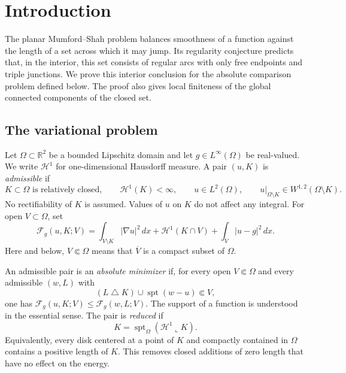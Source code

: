 \section{Introduction}
The planar Mumford--Shah problem balances smoothness of a function against
the length of a set across which it may jump.  Its regularity conjecture
predicts that, in the interior, this set consists of regular arcs with only
free endpoints and triple junctions.  We prove this interior conclusion
for the absolute comparison problem defined below.  The proof also gives
local finiteness of the global connected components of the closed set.

\subsection{The variational problem}
\label{sec:problem}
Let $\Omega\subset\mathbb R^2$ be a bounded Lipschitz domain and let
$g\in L^\infty(\Omega)$ be real-valued.  We write $\mathcal H^1$ for
one-dimensional Hausdorff measure.  A pair $(u,K)$ is \emph{admissible} if
\[
 K\subset\Omega\text{ is relatively closed},\qquad
 \mathcal H^1(K)<\infty,\qquad
 u\in L^2(\Omega),\qquad
 u|_{\Omega\setminus K}\in W^{1,2}(\Omega\setminus K).
\]
No rectifiability of $K$ is assumed.  Values of $u$ on $K$ do not affect
any integral.  For open $V\subset\Omega$, set
\begin{equation}\label{eq:original-energy}
 \mathcal F_g(u,K;V)
 =\int_{V\setminus K}|\nabla u|^2\,dx
   +\mathcal H^1(K\cap V)+\int_V|u-g|^2\,dx.
\end{equation}
Here and below, $V\Subset\Omega$ means that $\overline V$ is a compact
subset of $\Omega$.

An admissible pair is an \emph{absolute minimizer} if, for every open
$V\Subset\Omega$ and every admissible $(w,L)$ with
\begin{equation}\label{eq:compact-comparison}
 (L\mathbin{\triangle}K)\cup\operatorname{spt}(w-u)\Subset V,
\end{equation}
one has $\mathcal F_g(u,K;V)\le\mathcal F_g(w,L;V)$.
The support of a function is understood in the essential sense.
The pair is \emph{reduced} if
\begin{equation}\label{eq:reduced}
 K=\operatorname{spt}_{\Omega}(\mathcal H^1\!\llcorner K).
\end{equation}
Equivalently, every disk centered at a point of $K$ and compactly
contained in $\Omega$ contains a positive length of $K$.  This removes
closed additions of zero length that have no effect on the energy.

